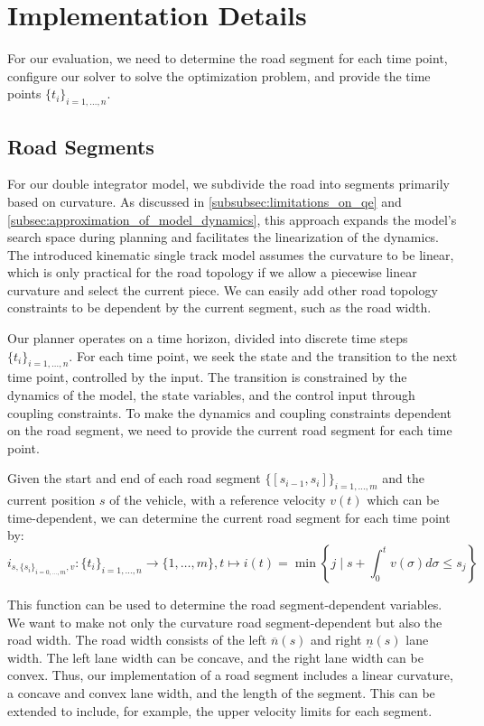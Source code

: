 \section{Implementation Details} \label{sec:implementation_details}

For our evaluation, we need to determine the road segment for each time point, configure our solver to solve the optimization problem, and provide
the time points $\{t_i\}_{i=1,\dots,n}$.

\subsection{Road Segments}

For our double integrator model, we subdivide the road into segments primarily based on curvature.
As discussed in \ref{subsubsec:limitations_on_qe} and \ref{subsec:approximation_of_model_dynamics}, this approach expands the model's search space
during planning and facilitates the linearization of the dynamics.
The introduced kinematic single track model assumes the curvature to be linear, which is only practical for the road topology if we allow a piecewise
linear curvature and select the current piece.
We can easily add other road topology constraints to be dependent by the current segment, such as the road width.

Our planner operates on a time horizon, divided into discrete time steps $\{t_i\}_{i=1,\dots,n}$.
For each time point, we seek the state and the transition to the next time point, controlled by the input.
The transition is constrained by the dynamics of the model, the state variables, and the control input through coupling constraints.
To make the dynamics and coupling constraints dependent on the road segment, we need to provide the current road segment for each time point.

Given the start and end of each road segment $\{[s_{i-1}, s_{i}]\}_{i=1,\dots,m}$ and the current position $s$ of the vehicle, with a reference velocity
$v(t)$ which can be time-dependent, we can determine the current road segment for each time point by:
\begin{equation}
	i_{s, \{s_{i}\}_{i=0,\dots,m}, v}: \{t_i\}_{i=1,\dots,n} \to \{1,\dots,m\}, t \mapsto i(t) = \min \left\{ j \mid s + \int_{0}^{t} v(\sigma) d\sigma \leq s_j \right\}
\end{equation}

This function can be used to determine the road segment-dependent variables.
We want to make not only the curvature road segment-dependent but also the road width.
The road width consists of the left $\overline{n}(s)$ and right $\underline{n}(s)$ lane width.
The left lane width can be concave, and the right lane width can be convex.
Thus, our implementation of a road segment includes a linear curvature, a concave and convex lane width, and the length of the segment.
This can be extended to include, for example, the upper velocity limits for each segment.

